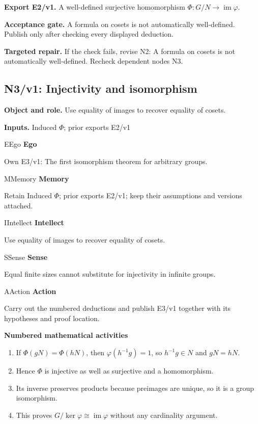 \documentclass[preprint,12pt,aps,pra,showkeys,amsmath,amssymb,superscriptaddress,floatfix]{revtex4-2}
\theoremstyle{definition}
\theoremstyle{remark}
\newcommand{\mmfaculty}[3]{%
 \begin{mmfacultybox}{#1}{#2}
 {\sffamily\bfseries\color{MMBlue}#2}\par\smallskip #3
 \end{mmfacultybox}}
\newcommand{\field}[2]{\par\smallskip\noindent\textbf{#1.} #2\par}
\begin{document}
\field{Export E2/v1}{A well-defined surjective homomorphism
\(\Phi :G/N\to \operatorname{im} \varphi\).}

\field{Acceptance gate}{A formula on cosets is not automatically well-defined. Publish only
after checking every displayed deduction.}

\field{Targeted repair}{If the check fails, revise N2: A formula on cosets is not automatically
well-defined. Recheck dependent nodes N3.}

\clearpage

\subsection{N3/v1: Injectivity and isomorphism}

\field{Object and role}{Use equality of images to recover equality of cosets.}

\field{Inputs}{Induced \(\Phi\); prior exports E2/v1}

\mmfaculty{E}{Ego}{Own E3/v1: The first isomorphism theorem for arbitrary groups.}

\mmfaculty{M}{Memory}{Retain Induced \(\Phi\); prior exports E2/v1; keep their assumptions and
versions attached.}

\mmfaculty{I}{Intellect}{Use equality of images to recover equality of cosets.}

\mmfaculty{S}{Sense}{Equal finite sizes cannot substitute for injectivity in infinite groups.}

\mmfaculty{A}{Action}{Carry out the numbered deductions and publish E3/v1 together with its
hypotheses and proof location.}

\smallskip\noindent\textbf{Numbered mathematical activities}

\begin{enumerate}[label=N3.\arabic*,leftmargin=3.4em]

\item If \(\Phi (gN)=\Phi (hN)\), then \(\varphi (h^{-1}g)=1\), so
\(h^{-1}g\in N\) and \(gN=hN\).

\item Hence \(\Phi\) is injective as well as surjective and a homomorphism.

\item Its inverse preserves products because preimages are unique, so it is a
group isomorphism.

\item This proves
\(G/\operatorname{ker} \varphi \cong \operatorname{im} \varphi\) without
any cardinality argument.

\end{enumerate}
\end{document}
